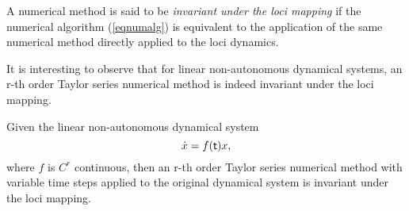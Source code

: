\begin{defn}
A numerical method is said to be {\em invariant under the loci mapping} if the
numerical algorithm (\ref{eqnumalg}) is equivalent to the application of the
same numerical method directly applied to the loci dynamics.
\end{defn}

It is interesting to observe that for linear non-autonomous dynamical systems,
an r-th order Taylor series numerical method is indeed invariant under the loci
mapping.

\begin{lemma}
\label{lemlde} Given the linear non-autonomous dynamical system
\begin{equation} \label{eqlnde}
  \dot{x} = f( \mathsf{\mathsf{t}}) x,
\end{equation}
where $f$ is $C^r$ continuous, then an r-th order Taylor series numerical method
with variable time steps applied to the original dynamical system is invariant
under the loci mapping.
\end{lemma}
